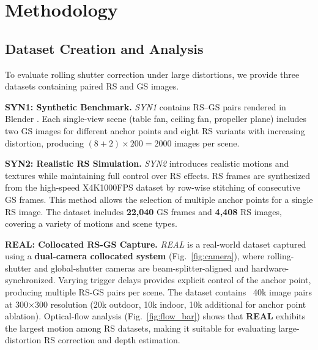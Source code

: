

\section{Methodology}

\subsection{Dataset Creation and Analysis}

To evaluate rolling shutter correction under large distortions, we provide three datasets containing paired RS and GS images. 


\vspace{1mm}
\noindent \textbf{SYN1: Synthetic Benchmark.}  
\textit{SYN1} contains RS–GS pairs rendered in Blender \cite{villar2021learning}. Each single-view scene (table fan, ceiling fan, propeller plane) includes two GS images for different anchor points and eight RS variants with increasing distortion, producing $(8 + 2)\times200 = 2000$ images per scene. 


\vspace{1mm}
\noindent \textbf{SYN2: Realistic RS Simulation.}  
\textit{SYN2} introduces realistic motions and textures while maintaining full control over RS effects. RS frames are synthesized from the high-speed X4K1000FPS dataset \cite{X4K} by row-wise stitching of consecutive GS frames. This method allows the selection of multiple anchor points for a single RS image.  The dataset includes \textbf{22{,}040} GS frames and \textbf{4{,}408} RS images, covering a variety of motions and scene types.


\noindent \textbf{REAL: Collocated RS-GS Capture.}
\textit{REAL} is a real-world dataset captured using a \textbf{dual-camera collocated system} (Fig.~\ref{fig:camera}), where rolling-shutter and global-shutter cameras are beam-splitter-aligned and hardware-synchronized. Varying trigger delays provides explicit control of the anchor point, producing multiple RS-GS pairs per scene. The dataset contains ~40k image pairs at 300×300 resolution (20k outdoor, 10k indoor, 10k additional for anchor point ablation). Optical-flow analysis (Fig.~\ref{fig:flow_bar}) shows that \textbf{REAL} exhibits the largest motion among RS datasets, making it suitable for evaluating large-distortion RS correction and depth estimation. 

